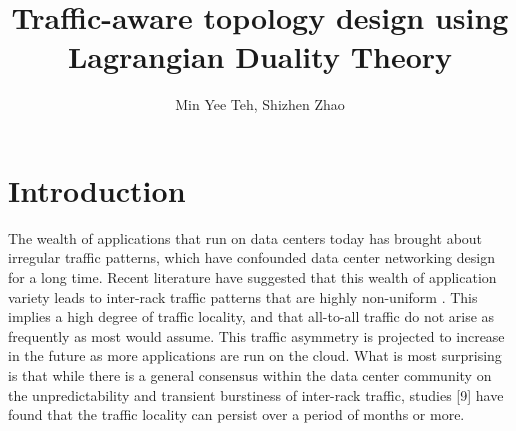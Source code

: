 \documentclass[sigconf]{acmart}
\begin{document}
\title{Traffic-aware topology design using Lagrangian Duality Theory}


\author{Min Yee Teh, Shizhen Zhao}

\renewcommand{\shortauthors}{Teh .et al.}

\begin{abstract}
    \blindtext
\end{abstract}

\maketitle

\newcommand{\floor}[1]{\left\lfloor #1 \right\rfloor}
\newcommand{\ceil}[1]{\left\lceil #1 \right\rceil}
\section{Introduction}

The wealth of applications that run on data centers today has brought about irregular traffic patterns, which have confounded data center networking design for a long time. Recent literature have suggested that this wealth of application variety leads to inter-rack traffic patterns that are highly non-uniform \cite{benson2010network, benson2009understanding}. This implies a high degree of traffic locality, and that all-to-all traffic do not arise as frequently as most would assume. This traffic asymmetry is projected to increase in the future as more applications are run on the cloud. What is most surprising is that while there is a general consensus within the data center community on the unpredictability and transient burstiness of inter-rack traffic, studies [9] have found that the traffic locality can persist over a period of months or more. 
\end{document}
